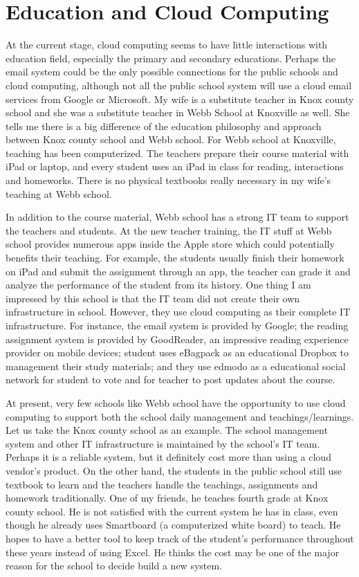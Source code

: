 \section{Education and Cloud Computing}
At the current stage, cloud computing seems to have little interactions with education field, especially the primary and secondary educations. Perhaps the email system could be the only possible connections for the public schools and cloud computing, although not all the public school system will use a cloud email services from Google or Microsoft. My wife is a substitute teacher in Knox county school and she was a substitute teacher in Webb School at Knoxville as well. She tells me there is a big difference of the education philosophy and approach between Knox county school and Webb school. For Webb school at Knoxville, teaching has been computerized. The teachers prepare their course material with iPad or laptop, and every student uses an iPad in class for reading, interactions and homeworks. There is no physical textbooks really necessary in my wife's teaching at Webb school.

In addition to the course material, Webb school has a strong IT team to support the teachers and students. At the new teacher training, the IT stuff at Webb school provides numerous apps inside the Apple store which could potentially benefits their teaching. For example, the students usually finish their homework on iPad and submit the assignment through an app, the teacher can grade it and analyze the performance of the student from its history. One thing I am impressed by this school is that the IT team did not create their own infrastructure in school. However, they use cloud computing as their complete IT infrastructure. For instance, the email system is provided by Google; the reading assignment system is provided by GoodReader, an impressive reading experience provider on mobile devices; student uses eBagpack as an educational Dropbox to management their study materials; and they use edmodo as a educational social network for student to vote and for teacher to post updates about the course. 

At present, very few schools like Webb school have the opportunity to use cloud computing to support both the school daily management and teachings/learnings. Let us take the Knox county school as an example. The school management system  and other IT infrastructure is maintained by the school's IT team. Perhaps it is a reliable system, but it definitely cost more than using a cloud vendor's product. On the other hand, the students in the public school still use textbook to learn and the teachers handle the teachings, assignments and homework traditionally. One of my friends, he teaches fourth grade at Knox county school. He is not satisfied with the current system he has in class, even though he already uses Smartboard (a computerized white board) to teach. He hopes to have a better tool to keep track of the student's performance throughout these years instead of using Excel. He thinks the cost may be one of the major reason for the school to decide build a new system.


